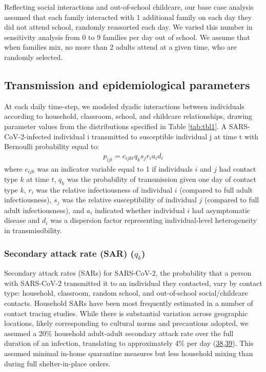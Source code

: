 \documentclass[
]{article}
\begin{document}
Reflecting social interactions and out-of-school childcare, our base
case analysis assumed that each family interacted with 1 additional
family on each day they did not attend school, randomly reassorted each
day. We varied this number in sensitivity analysis from 0 to 9 families
per day out of school. We assume that when families mix, no more than 2
adults attend at a given time, who are randomly selected.

\hypertarget{transmission-and-epidemiological-parameters}{%
\subsection{Transmission and epidemiological
parameters}\label{transmission-and-epidemiological-parameters}}

At each daily time-step, we modeled dyadic interactions between
individuals according to household, classroom, school, and childcare
relationships, drawing parameter values from the distributions specified
in Table \ref{tab:tbl1}. A SARS-CoV-2-infected individual i transmitted
to susceptible individual j at time t with Bernoulli probability equal
to: \begin{align*}
p_{ijt}= c_{ijkt} q_k s_j r_i a_i d_i 
\end{align*} where \(c_{ijk}\) was an indicator variable equal to 1 if
individuals \(i\) and \(j\) had contact type \(k\) at time \(t\),
\(q_k\) was the probability of transmission given one day of contact
type \(k\), \(r_i\) was the relative infectiousness of individual \(i\)
(compared to full adult infectiousness), \(s_j\) was the relative
susceptibility of individual \(j\) (compared to full adult
infectiousness), and \(a_i\) indicated whether individual \(i\) had
asymptomatic disease and \(d_i\) was a dispersion factor representing
individual-level heterogeneity in transmissibility.

\medskip

\hypertarget{secondary-attack-rate-sar-q_k}{%
\subsubsection{\texorpdfstring{Secondary attack rate (SAR)
(\(q_k\))}{Secondary attack rate (SAR) (q\_k)}}\label{secondary-attack-rate-sar-q_k}}

Secondary attack rates (SARs) for SARS-CoV-2, the probability that a
person with SARS-CoV-2 transmitted it to an individual they contacted,
vary by contact type: household, classroom, random school, and
out-of-school social/childcare contacts. Household SARs have been most
frequently estimated in a number of contact tracing studies. While there
is substantial variation across geographic locations, likely
corresponding to cultural norms and precautions adopted, we assumed a
20\% household adult-adult secondary attack rate over the full duration
of an infection, translating to approximately 4\% per day
(\protect\hyperlink{ref-madewell_household_2020}{38},\protect\hyperlink{ref-fung_household_2020}{39}).
This assumed minimal in-home quarantine measures but less household
mixing than during full shelter-in-place orders.
\end{document}
